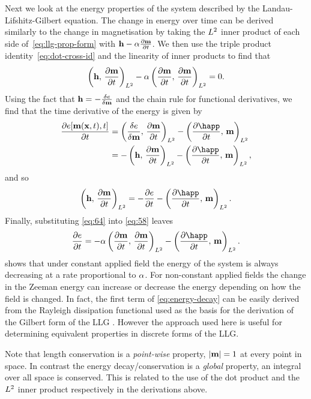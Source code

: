 Next we look at the energy properties of the system described by the Landau-Lifshitz-Gilbert equation.
The change in energy over time can be derived similarly to the change in magnetisation by taking the ${L^2}$ inner product of each side of~\cref{eq:llg-prop-form} with $\boldsymbol{\mathrm{h}} - \alpha \frac{\partial \boldsymbol{\mathrm{m}}}{\partial t}$.
We then use the triple product identity~\cref{eq:dot-cross-id} and the linearity of inner products to find that
\begin{equation}
  \label{eq:58}
  \left(\boldsymbol{\mathrm{h}},\, \frac{\partial \boldsymbol{\mathrm{m}}}{\partial t} \right)_{{L^2}} - \alpha \left(\frac{\partial \boldsymbol{\mathrm{m}}}{\partial t},\, \frac{\partial \boldsymbol{\mathrm{m}}}{\partial t} \right)_{{L^2}} = 0.
\end{equation}
Using the fact that $\boldsymbol{\mathrm{h}} = -\frac{\delta e}{\delta \boldsymbol{\mathrm{m}}}$ and the chain rule for functional derivatives, we find that the time derivative of the energy is given by
\begin{align*}
  \pd{\e[\mv(\xv, t), t]}{t} &= \ltip{\vd{e}{\mv}}{\dmdt} - \ltip{\pd{\happ}{t}}{\mv} \\
                             &= -\ltip{\hv}{\dmdt} - \ltip{\pd{\happ}{t}}{\mv},
\end{align*}
and so
\begin{equation}
  \ltip{\hv}{\dmdt} = -\pd{\e}{t} - \ltip{\pd{\happ}{t}}{\mv}.
  \label{eq:64}
\end{equation}
Finally, substituting \cref{eq:64} into \cref{eq:58} leaves
\begin{equation}
  \label{eq:energy-decay}
  \pd{\e}{t} = -\dampc \ltip{\dmdt}{\dmdt} - \ltip{\pd{\happ}{t}}{\mv}.
\end{equation}
 shows that under constant applied field the energy of the system is always decreasing at a rate proportional to $\alpha$.
For non-constant applied fields the change in the Zeeman energy can increase or decrease the energy depending on how the field is changed. %
In fact, the first term of \cref{eq:energy-decay} can be easily derived from the Rayleigh dissipation functional used as the basis for the derivation of the Gilbert form of the LLG \cite{Gilbert2004}.
However the approach used here is useful for determining equivalent properties in discrete forms of the LLG.

Note that length conservation is a \emph{point-wise} property, \ie $\left|{\boldsymbol{\mathrm{m}}} \right| = 1$ at every point in space.
In contrast the energy decay/conservation is a \emph{global} property, \ie an integral over all space is conserved.
This is related to the use of the dot product and the ${L^2}$ inner product respectively in the derivations above.


